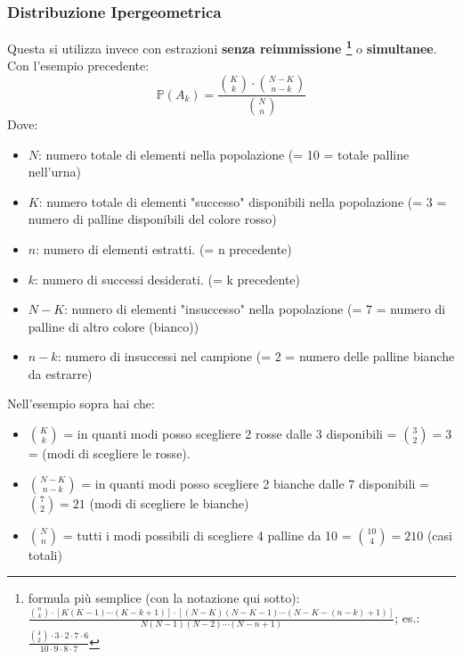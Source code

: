 \documentclass[12pt]{extarticle} %
\begin{document}
\subsubsection{Distribuzione Ipergeometrica}
Questa si utilizza invece con estrazioni \textbf{senza reimmissione \footnote{formula più semplice (con la notazione qui sotto): $\frac{\binom{n}{k} \cdot [K(K-1)\cdots(K-k+1)] \cdot [(N-K)(N-K-1)\cdots(N-K-(n-k)+1)]}{N(N-1)(N-2)\cdots(N-n+1)}$; es.: $\frac{\binom{4}{2} \cdot 3 \cdot 2 \cdot 7 \cdot 6}{10 \cdot 9 \cdot 8 \cdot 7}$}} o \textbf{simultanee}. Con l'esempio precedente:
$$\mathbb{P}(A_k) = \frac{\binom{K}{k} \cdot \binom{N - K}{n - k}}{\binom{N}{n}}$$
Dove: 
\begin{itemize}
    \item $N$: numero totale di elementi nella popolazione {\footnotesize (= 10 = totale palline nell'urna)}
    \item $K$: numero totale di elementi "successo" disponibili nella popolazione {\footnotesize (= 3 = numero di palline disponibili del colore rosso)}
    \item $n$: numero di elementi estratti. {\footnotesize (= n precedente)}
    \item $k$: numero di successi desiderati. {\footnotesize (= k precedente)}
    \item $N - K$: numero di elementi "insuccesso" nella popolazione {\footnotesize (= 7 = numero di palline di altro colore (bianco))}
    \item $n - k$: numero di insuccessi nel campione {\footnotesize (= 2 = numero delle palline bianche da estrarre)}
\end{itemize}
Nell'esempio sopra hai che:
\begin{itemize}[-]
    \item $\binom{K}{k}$ = in quanti modi posso scegliere 2 rosse dalle 3 disponibili = $\binom{3}{2} = 3$ = (modi di scegliere le rosse). 
    \item $\binom{N-K}{n-k}$ = in quanti modi posso scegliere 2 bianche dalle 7 disponibili = $\binom{7}{2} = 21$ (modi di scegliere le bianche)
    \item $\binom{N}{n}$ = tutti i modi possibili di scegliere 4 palline da 10 = $\binom{10}{4} = 210$ (casi totali)
\end{itemize}
\end{document}
